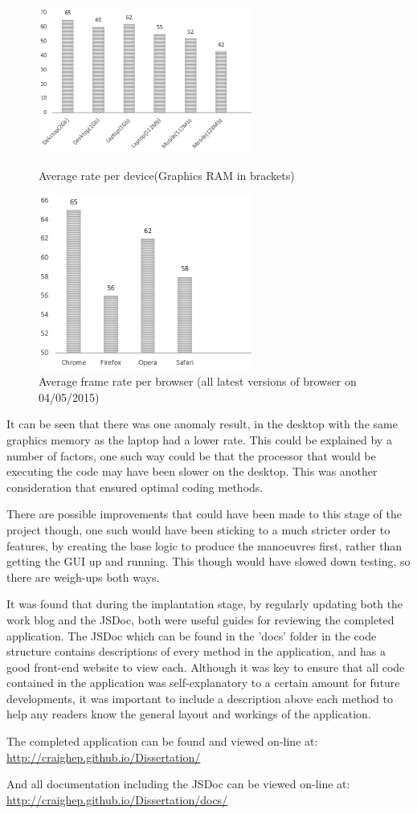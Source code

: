 \begin{figure}[h!]
\centering
\parbox{7cm}{
\includegraphics[width=7cm]{images/fpsMeasured.png}
\caption{Average rate per device(Graphics RAM in brackets)}
\label{fig:framerateDevices}}
\qquad
\begin{minipage}{7cm}
\includegraphics[width=7cm]{images/fpsMeasuredBrowsers.png}
\caption{Average frame rate per browser (all latest versions of browser on 04/05/2015)}
\label{fig:framerateDevicesBrowsers}
\end{minipage}
\end{figure}

It can be seen that there was one anomaly result, in the desktop with the same graphics memory as the laptop had a lower rate. This could be explained by a number of factors, one such way could be that the processor that would be executing the code may have been slower on the desktop. This was another consideration that ensured optimal coding methods.

There are possible improvements that could have been made to this stage of the project though, one such would have been sticking to a much stricter order to features, by creating the base logic to produce the manoeuvres first, rather than getting the GUI up and running. This though would have slowed down testing, so there are weigh-ups both ways.

It was found that during the implantation stage, by regularly updating both the work blog \cite{blog} and the JSDoc, both were useful guides for reviewing the completed application. The JSDoc which can be found in the 'docs' folder in the code structure contains descriptions of every method in the application, and has a good front-end website to view each. Although it was key to ensure that all code contained in the application was self-explanatory to a certain amount for future developments, it was important to include a description above each method to help any readers know the general layout and workings of the application. 

The completed application can be found and viewed on-line at: \url{http://craighep.github.io/Dissertation/}

And all documentation including the JSDoc can be viewed on-line at: \url{http://craighep.github.io/Dissertation/docs/}